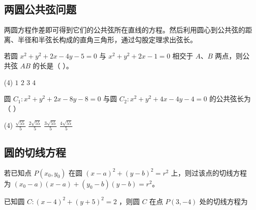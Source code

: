 \vspace{4em}

\subsection{两圆公共弦问题}

\begin{theorem}[两圆公共弦问题]
    两圆方程作差即可得到它们的公共弦所在直线的方程。然后利用圆心到公共弦的距离、半径和半弦长构成的直角三角形，通过勾股定理求出弦长。
\end{theorem}
\begin{example}
    若圆 $x^2+y^2+2 x-4 y-5=0$ 与 $x^2+y^2+2 x-1=0$ 相交于 $A 、 B$ 两点，则公共弦 $A B$ 的长是（ \hspace{2em} ）。
    \begin{tasks}(4)
        \task $1$
        \task $2$
        \task $3$
        \task $4$
    \end{tasks}
\end{example}

\vspace{4em}

\begin{example}
    圆 $C_1: x^2+y^2+2 x-8 y-8=0$ 与圆 $C_2: x^2+y^2+4 x-4 y-4=0$ 的公共弦长为（ \hspace{2em} ）
    \begin{tasks}(4)
        \task $\frac{\sqrt{55}}{5}$
        \task $\frac{2 \sqrt{55}}{5}$
        \task $\frac{3 \sqrt{55}}{5}$
        \task $\frac{4 \sqrt{55}}{5}$
    \end{tasks}
\end{example}

\vspace{4em}

\subsection{圆的切线方程}

\begin{theorem}[圆的切线方程]
    若已知点 $P(x_0, y_0)$ 在圆 $(x-a)^2+(y-b)^2=r^2$ 上，则过该点的切线方程为 $(x_0-a)(x-a)+(y_0-b)(y-b)=r^2$。
\end{theorem}

\begin{example}
    已知圆 $C:(x-4)^2+(y+5)^2=2$ ，则圆 $C$ 在点 $P(3,-4)$ 处的切线方程为 \underline{\qquad}
\end{example}

\vspace{4em}

